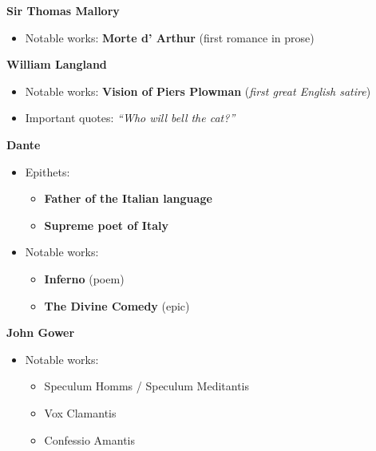 \documentclass[
  12pt,
    progressbar=frametitle]{beamer}
\providecommand{\tightlist}{%
  \setlength{\itemsep}{0pt}\setlength{\parskip}{0pt}}
\begin{document}
\begin{frame}[allowframebreaks]
\large\textbf{Sir Thomas Mallory}\normalsize\vspace{-3mm}

\begin{itemize}
\tightlist
\item
  Notable works: \textbf{Morte d' Arthur} (first romance in prose)
\end{itemize}

\large\textbf{William Langland}\normalsize\vspace{-3mm}

\begin{itemize}
\tightlist
\item
  Notable works: \textbf{Vision of Piers Plowman} (\emph{first great
  English satire})
\item
  Important quotes: \emph{``Who will bell the cat?''}
\end{itemize}

\large\textbf{Dante}\normalsize\vspace{-3mm}

\begin{itemize}
\tightlist
\item
  Epithets:

  \begin{itemize}
  \tightlist
  \item
    \textbf{Father of the Italian language}
  \item
    \textbf{Supreme poet of Italy}
  \end{itemize}
\item
  Notable works:

  \begin{itemize}
  \tightlist
  \item
    \textbf{Inferno} (poem)
  \item
    \textbf{The Divine Comedy} (epic)
  \end{itemize}
\end{itemize}

\large\textbf{John Gower}\normalsize\vspace{-3mm}

\begin{itemize}
\tightlist
\item
  Notable works:

  \begin{itemize}
  \tightlist
  \item
    Speculum Homms / Speculum Meditantis
  \item
    Vox Clamantis
  \item
    Confessio Amantis
  \end{itemize}
\end{itemize}

\end{frame}
\end{document}
